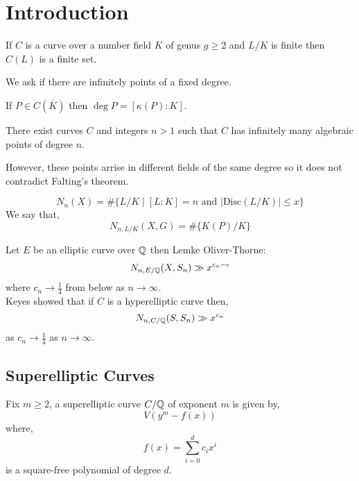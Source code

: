 \documentclass[12pt]{article}
\begin{document}
\section{Introduction}

\begin{theorem}[Faltings]
If $C$ is a curve over a number field $K$ of genus $g \ge 2$ and $L/K$ is finite then $C(L)$ is a finite set.
\end{theorem}

We ask if there are infinitely points of a fixed degree.

\begin{defn}
If $P \in C(\overline{K})$ then $\deg{P} = [\kappa(P) : K]$. 
\end{defn}

\begin{theorem}
There exist curves $C$ and integers $n > 1$ such that $C$ has infinitely many algebraic points of degree $n$.
\end{theorem}

\begin{rmk}
However, these points arrise in different fields of the same degree so it does not contradict Falting's theorem.
\end{rmk}

\begin{defn}
\[ N_n(X) = \# \{ L/K \mid [L : K] = n \text{ and } | \mathrm{Disc}(L/K) | \le x \} \]
We say that,
\[ N_{n, L/K}(X, G) = \# \{ K(P) / K \} \]
\end{defn}


Let $E$ be an elliptic curve over $\mathbb{Q}$ then Lemke Oliver-Thorne:
\[ N_{n,E/\mathbb{Q}}(X, S_n) \gg x^{c_n - \epsilon} \]
where $c_n \to \frac{1}{4}$ from below as $n \to \infty$. 
\bigskip\\
Keyes showed that if $C$ is a hyperelliptic curve then,
\[ N_{n, C/\mathbb{Q}}(S, S_n) \gg x^{c_n} \]
as $c_n \to \frac{1}{4}$ as $n \to \infty$.

\subsection{Superelliptic Curves}

Fix $m \ge 2$, a superelliptic curve $C/\mathbb{Q}$ of exponent $m$ is given by,
\[ V(y^m - f(x)) \]
where,
\[ f(x) = \sum_{i = 0}^d c_i x^i \]
is a square-free polynomial of degree $d$.

\end{document}
